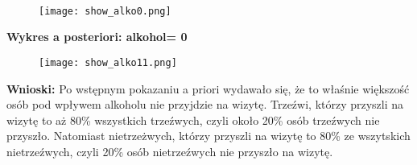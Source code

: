 \documentclass[12pt]{article}
\begin{document}
\\
\begin{flushright}
\begin{figure}[ht!]
\texttt{[image: show\_alko0.png]}
\label{fig:2}
\end{figure}
\end{flushright}
\begin{center}
\textbf{Wykres a posteriori: alkohol= 0}    
\end{center}
\begin{figure}[ht!]
\begin{center}
\texttt{[image: show\_alko11.png]}
\label{fig:2}
\end{center}
\end{figure}
\textbf{Wnioski:} Po wstępnym pokazaniu a priori wydawało się, że to właśnie większość osób pod wpływem alkoholu nie przyjdzie na wizytę. Trzeźwi, którzy przyszli na wizytę to aż 80\% wszystkich trzeźwych, czyli około 20\% osób trzeźwych nie przyszło. Natomiast nietrzeżwych, którzy przyszli na wizytę to 80\% ze wszytskich nietrzeźwych, czyli 20\% osób nietrzeźwych nie przyszło na wizytę.
\end{document}

